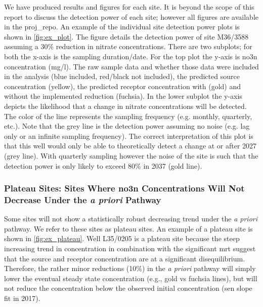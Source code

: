 We have produced results and figures for each site. It is beyond the scope of this report to discuss the detection power of each site; however all figures are available in the \gls{proj_repo}. An example of the individual site detection power plots is shown in \autoref{fig:ex_plot}. The figure details the detection power of site M36/3588 assuming a 30\% reduction in nitrate concentrations. There are two subplots; for both the x-axis is the sampling duration/date. For the top plot the y-axis is \gls{no3n} concentration (mg/l). The raw sample data and whether those data were included in the analysis (blue included, red/black not included), the predicted source concentration (yellow), the predicted receptor concentration with (gold) and without the implemented reduction (fuchsia). In the lower subplot the y-axis depicts the likelihood that a change in nitrate concentrations will be detected. The color of the line represents the sampling frequency (e.g. monthly, quarterly, etc.). Note that the grey line is the detection power assuming no noise (e.g. lag only or an infinite sampling frequency). The correct interpretation of this plot is that this well would only be able to theoretically detect a change at or after 2027 (grey line). With quarterly sampling however the noise of the site is such that the detection power is only likely to exceed 80\% in 2037 (gold line).


\subsubsection[Plateau Sites]{Plateau Sites: Sites Where \gls{no3n} Concentrations Will Not Decrease Under the \textit{a priori} Pathway} \label{sec:plateau_results}

Some sites will not show a statistically robust decreasing trend under the \textit{a priori} pathway. We refer to these sites as plateau sites. An example of a plateau site is shown in \autoref{fig:ex_plateau}. Well L35/0205 is a plateau site because the steep increasing trend in concentration in combination with the significant \gls{mrt} suggest that the source and receptor concentration are at a significant disequilibrium. Therefore, the rather minor reductions (10\%) in the \textit{a priori} pathway will simply lower the eventual steady state concentration (e.g., gold vs fuchsia lines), but will not reduce the concentration below the observed initial concentration (sen slope fit in 2017).

